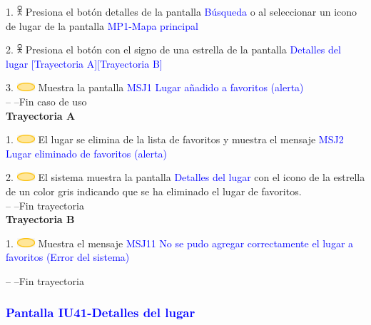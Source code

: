     1. \includegraphics[width=0.0150\textwidth]{Figuras/persona.png} Presiona el botón detalles de la pantalla \textcolor{blue}{Búsqueda} o al seleccionar un icono de lugar de la pantalla \textcolor{blue}{MP1-Mapa principal}
    
    2. \includegraphics[width=0.0150\textwidth]{Figuras/PERSONA.png} Presiona el botón con el signo de una estrella de la pantalla \textcolor{blue}{Detalles del lugar [Trayectoria A][Trayectoria B]} 

    3. \includegraphics[width=0.0500\textwidth]{Figuras/sistema.png} Muestra la pantalla \textcolor{blue}{MSJ1 Lugar añadido a favoritos (alerta)}\\
    -- --Fin caso de uso\\

    \textbf{Trayectoria A}

    1. \includegraphics[width=0.0500\textwidth]{Figuras/sistema.png} El lugar se elimina de la lista de favoritos y muestra el mensaje \textcolor{blue}{MSJ2 Lugar eliminado de favoritos (alerta)}

    2. \includegraphics[width=0.0500\textwidth]{Figuras/sistema.png} El sistema muestra la pantalla  \textcolor{blue}{Detalles del lugar} con el icono de la estrella de un color gris indicando que se ha eliminado el lugar de favoritos.\\
    -- --Fin trayectoria\\

    \textbf{Trayectoria B}

    1. \includegraphics[width=0.0500\textwidth]{Figuras/sistema.png} Muestra el mensaje \textcolor{blue}{MSJ11 No se pudo agregar correctamente el lugar a favoritos (Error del sistema)}
    
    -- --Fin trayectoria
    
\subsubsection{\textcolor{blue}{Pantalla IU41-Detalles del lugar}}

